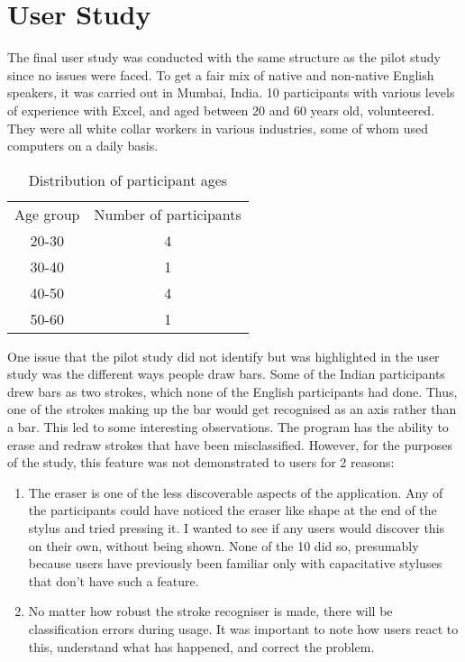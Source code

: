 \section{User Study}
The final user study was conducted with the same structure as the pilot study since no issues were faced. To get a fair mix of native and non-native English speakers, it was carried out in Mumbai, India. 10 participants with various levels of experience with Excel, and aged between 20 and 60 years old, volunteered. They were all white collar workers in various industries, some of whom used computers on a daily basis.

\begin{table}
\begin{center}
\begin{tabular}{c c}
Age group & Number of participants \\
20-30 & 4 \\
30-40 & 1 \\
40-50 & 4 \\
50-60 & 1 \\

\end{tabular}
\end{center}
\caption{Distribution of participant ages}
\end{table}

One issue that the pilot study did not identify but was highlighted in the user study was the different ways people draw bars. Some of the Indian participants drew bars as two strokes, which none of the English participants had done. Thus, one of the strokes making up the bar would get recognised as an axis rather than a bar. This led to some interesting observations. The program has the ability to erase and redraw strokes that have been misclassified. However, for the purposes of the study, this feature was not demonstrated to users for 2 reasons:
\begin{enumerate}
\item The eraser is one of the less discoverable aspects of the application. Any of the participants could have noticed the eraser like shape at the end of the stylus and tried pressing it. I wanted to see if any users would discover this on their own, without being shown. None of the 10 did so, presumably because users have previously been familiar only with capacitative styluses that don't have such a feature. 
\item No matter how robust the stroke recogniser is made, there will be classification errors during usage. It was important to note how users react to this, understand what has happened, and correct the problem.
\end{enumerate} 

